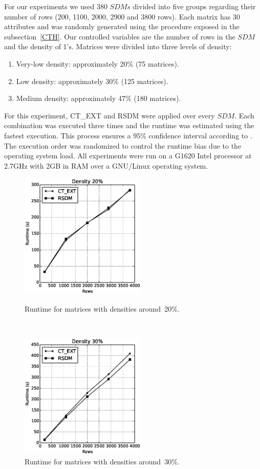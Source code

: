 \documentclass[authoryear,11pt]{elsarticle}
\begin{document}
	For our experiments we used 380 $SDMs$ divided into five groups regarding their number of rows (200,
	1100, 2000, 2900 and 3800 rows). Each matrix has 30 attributes and was randomly generated using the procedure
	exposed in the subsection~\ref{CTH}. Our controlled variables are the number of rows in the $SDM$ and the
	density of 1's. Matrices were divided into three levels of density:
	
	\begin{enumerate}
		\item Very-low density: approximately 20\% (75 matrices).
		\item Low density: approximately 30\% (125 matrices).
		\item Medium density: approximately 47\% (180 matrices).
	\end{enumerate}
	
	For this experiment, CT\_EXT and RSDM were applied over every $SDM$. 
	Each combination was executed three times and the runtime was estimated using the fastest execution. This
	process 	ensures a 95\% confidence interval according to \cite{Haveraaen01}. 
	The execution order was randomized to control the runtime bias due to the operating system load. All 
	experiments were run on a G1620 Intel processor at 2.7GHz with 2GB in RAM over a GNU/Linux operating system.
	
	\begin{figure}[htb]
	\centering
	\begin{minipage}{.45\textwidth}
	  \centering
	   \includegraphics[width=6cm , height=6cm]{vlow_density.eps}
	  \caption{Runtime for matrices with densities around~20\%.}
	  \label{fig:vlow}
	\end{minipage}%
	~~~
	\begin{minipage}{.45\textwidth}
	  \centering
	   \includegraphics[width=6cm , height=6cm]{low_density1.eps}
	  \caption{Runtime for matrices with densities around~30\%.}
	  \label{fig:low}
	\end{minipage}
	\end{figure}
	
\end{document}
